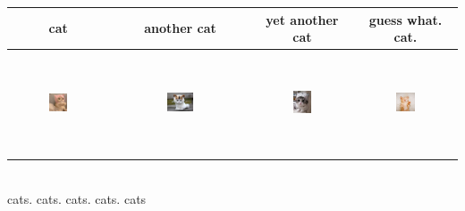 \documentclass[10pt,a4paper]{report}
\begin{document}
\begin{tabular}{c | c | c | c}
    cat & another cat & yet another cat & guess what. cat. \\ \hline
    \includegraphics[width=0.2\textwidth, height=30mm]{images/1.jpg} & \includegraphics[width=0.2\textwidth, height=30mm]{images/2.jpg} & \includegraphics[width=0.2\textwidth, height=30mm]{images/3.jpg} & \includegraphics[width=0.2\textwidth, height=30mm]{images/4.jpg} \\
\end{tabular} \\
\clearpage
cats. cats. cats. cats. cats \\
\end{document}
